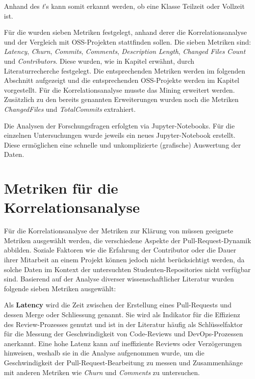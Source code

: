 Anhand des \textit{t}'s kann somit erkannt werden, ob eine Klasse Teilzeit oder Vollzeit ist.

Für die  wurden sieben Metriken festgelegt, anhand derer die Korrelationsanalyse und der Vergleich mit OSS-Projekten stattfinden sollen. Die sieben Metriken sind: \textit{Latency}, \textit{Churn}, \textit{Commits}, \textit{Comments}, \textit{Description Length}, \textit{Changed Files Count} und \textit{Contributors}. Diese wurden, wie in Kapitel  erwähnt, durch Literaturrecherche festgelegt. Die entsprechenden Metriken werden im folgenden Abschnitt  aufgezeigt und die entsprechenden OSS-Projekte werden im Kapitel  vorgestellt. Für die Korrelationsanalyse musste das Mining erweitert werden. Zusätzlich zu den bereits genannten Erweiterungen wurden noch die Metriken \textit{ChangedFiles} und \textit{TotalCommits} extrahiert.

Die Analysen der Forschungsfragen erfolgten via Jupyter-Notebooks. Für die einzelnen Untersuchungen wurde jeweils ein neues Jupyter-Notebook erstellt. Diese ermöglichen eine schnelle und unkomplizierte (grafische) Auswertung der Daten. \parencite{noauthor_repo-detectivesba-metric-analysis-scripts_nodate}


\section{Metriken für die Korrelations\-analyse}
\label{sec:MetrikenKorrelation}
Für die Korrelationsanalyse der Metriken zur Klärung von  müssen geeignete Metriken ausgewählt werden, die verschiedene Aspekte der Pull-Request-Dynamik abbilden. Soziale Faktoren wie die Erfahrung der Contributor oder die Dauer ihrer Mitarbeit an einem Projekt können jedoch nicht berücksichtigt werden, da solche Daten im Kontext der untersuchten Studenten-Repositories nicht verfügbar sind. Basierend auf der Analyse diverser wissenschaftlicher Literatur wurden folgende sieben Metriken ausgewählt:

Als \textbf{Latency} wird die Zeit zwischen der Erstellung eines Pull-Requests und dessen Merge oder Schliessung genannt. Sie wird als Indikator für die Effizienz des Review-Prozesses genutzt und ist in der Literatur häufig als Schlüsselfaktor für die Messung der Geschwindigkeit von Code-Reviews und DevOps-Prozessen anerkannt. Eine hohe Latenz kann auf ineffiziente Reviews oder Verzögerungen hinweisen, weshalb sie in die Analyse aufgenommen wurde, um die Geschwindigkeit der Pull-Request-Bearbeitung zu messen und Zusammenhänge mit anderen Metriken wie \textit{Churn} und \textit{Comments} zu untersuchen. \parencite{yu_wait_2015}

